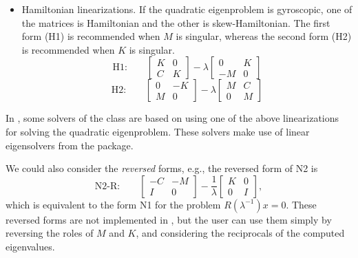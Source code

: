 \begin{itemize}
\medskip
\item Hamiltonian linearizations. If the quadratic eigenproblem is gyroscopic, one of the matrices is Hamiltonian and the other is skew-Hamiltonian. The first form (H1) is recommended when $M$ is singular, whereas the second form (H2) is recommended when $K$ is singular.
\begin{equation}
\label{eq:h1}
\mbox{H1:}\qquad
\left[\begin{array}{cc}K & 0\\C & K\end{array}\right]-\lambda\left[\begin{array}{cc} 0 & K\\-M & 0\end{array}\right]
\end{equation}
\begin{equation}
\label{eq:h2}
\mbox{H2:}\qquad
\left[\begin{array}{cc}0 & -K\\M & 0\end{array}\right]-\lambda\left[\begin{array}{cc}M & C\\ 0 & M\end{array}\right]
\end{equation}
\end{itemize}

In \slepc, some solvers of the  class are based on using one of the above linearizations for solving the quadratic eigenproblem. These solvers make use of linear eigensolvers from the  package.

We could also consider the \emph{reversed} forms, e.g., the reversed form of N2 is
\begin{equation}
\label{eq:n2r}
\mbox{N2-R:}\qquad
\left[\begin{array}{cc}-C & -M\\I & 0\end{array}\right]-\frac{1}{\lambda}\left[\begin{array}{cc}K & 0\\0 & I\end{array}\right],
\end{equation}
which is equivalent to the form N1 for the problem $R(\lambda^{-1})x=0$. These reversed forms are not implemented in \slepc, but the user can use them simply by reversing the roles of $M$ and $K$, and considering the reciprocals of the computed eigenvalues.

